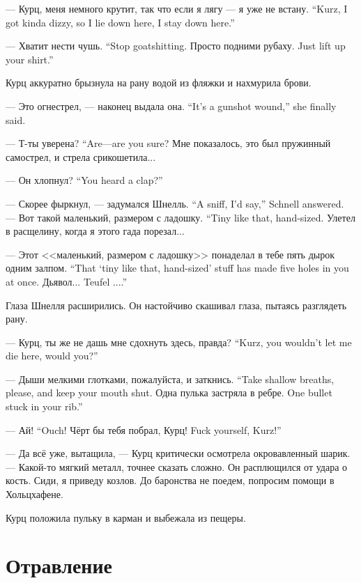 {--- Курц, меня немного крутит, так что если я лягу --- я уже не встану.}
{``Kurz, I got kinda dizzy, so I lie down here, I stay down here.''}

{--- Хватит нести чушь.}
{``Stop goatshitting.}
{Просто подними рубаху.}
{Just lift up your shirt.''}

Курц аккуратно брызнула на рану водой из фляжки и нахмурила брови.

{--- Это огнестрел, --- наконец выдала она.}
{``It's a gunshot wound,'' she finally said.}

{--- Т-ты уверена?}
{``Are---are you sure?}
Мне показалось, это был пружинный самострел, и стрела срикошетила...

{--- Он хлопнул?}
{``You heard a clap?''}

{--- Скорее фыркнул, --- задумался Шнелль.}
{``A sniff, I'd say,'' Schnell answered.}
{--- Вот такой маленький, размером с ладошку.}
{``Tiny like that, hand-sized.}
Улетел в расщелину, когда я этого гада порезал...

{--- Этот <<маленький, размером с ладошку>> понаделал в тебе пять дырок одним залпом.}
{``That `tiny like that, hand-sized' stuff has made five holes in you at once.}
{Дьявол...}
{Teufel ....''}

Глаза Шнелля расширились.
Он настойчиво скашивал глаза, пытаясь разглядеть рану.

{--- Курц, ты же не дашь мне сдохнуть здесь, правда?}
{``Kurz, you wouldn't let me die here, would you?''}

{--- Дыши мелкими глотками, пожалуйста, и заткнись.}
{``Take shallow breaths, please, and keep your mouth shut.}
{Одна пулька застряла в ребре.}
{One bullet stuck in your rib.''}

{--- Ай!}
{``Ouch!}
{Чёрт бы тебя побрал, Курц!}
{Fuck yourself, Kurz!''}

--- Да всё уже, вытащила, --- Курц критически осмотрела окровавленный шарик.
--- Какой-то мягкий металл, точнее сказать сложно.
Он расплющился от удара о кость.
Сиди, я приведу козлов.
До баронства не поедем, попросим помощи в Хольцхафене.

Курц положила пульку в карман и выбежала из пещеры.

\section{Отравление}

